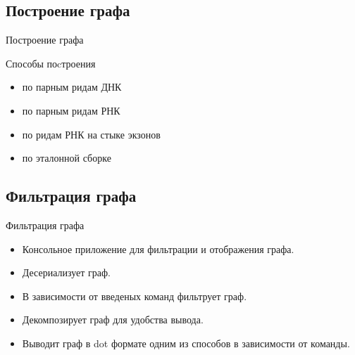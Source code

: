 \documentclass{beamer}
\newcommand{\cimg}[2]{%
	\begin{center}%
		\ifthenelse{\equal{#2}{}}{%
			\texttt{[image: \#1]}
		}{%
			\texttt{[image: \#1]}
		}%
	\end{center}%
}
\begin{document}
\subsection{Построение графа}
\begin{frame}[t]{Построение графа}
\cimg{BuilderClassDiagram.jpg}{1}	
\end{frame}
\begin{frame}[t]{Способы поcтроения}
\begin{itemize}
	\item по парным ридам ДНК
	\item по парным ридам РНК
	\item по ридам РНК на стыке экзонов
	\item по эталонной сборке
\end{itemize}
\cimg{p5.png}{1.21}
\end{frame}

\subsection{Фильтрация графа}
\begin{frame}[t]{Фильтрация графа}
	\begin{itemize}
		\item Консольное приложение для фильтрации и отображения графа.
		\item Десериализует граф. 
		\item В зависимости от введеных команд фильтрует граф. 
		\item Декомпозирует граф для удобства вывода.
		\item Выводит граф в dot формате одним из способов в зависимости от команды. 
	\end{itemize}
\end{frame}
\end{document}

